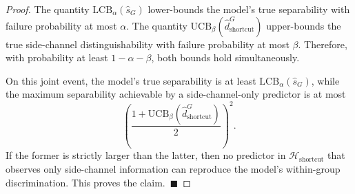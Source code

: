 \documentclass[conference]{IEEEtran}
\theoremstyle{remark}
\newcommand{\LCB}{\mathrm{LCB}}
\newcommand{\UCB}{\mathrm{UCB}}
\newcommand{\shat}{\hat{s}_G}
\newcommand{\hatshortcutDisc}{\hat d_{\mathrm{shortcut}}^{G}}
\newcommand{\shortcutHypCls}{\mathcal{H}_{\mathrm{shortcut}}}
\begin{document}
\begin{proof}
The quantity $\LCB_{\alpha}(\shat)$ lower-bounds the model's true separability
with failure probability at most $\alpha$.
The quantity $\UCB_{\beta}(\hatshortcutDisc)$ upper-bounds the true side-channel
distinguishability with failure probability at most $\beta$.
Therefore, with probability at least $1-\alpha-\beta$, both bounds hold
simultaneously.

On this joint event, the model's true separability is at least
$\LCB_{\alpha}(\shat)$, while the maximum separability achievable by a
side-channel-only predictor is at most
\begin{equation}\label{eq:formula-43}
\left(\frac{1+\UCB_{\beta}(\hatshortcutDisc)}{2}\right)^2 .
\end{equation}
If the former is strictly larger than the latter, then no predictor in $\shortcutHypCls$
that observes only side-channel information can reproduce the model's
within-group discrimination.
This proves the claim.~$\blacksquare$
\end{proof}
\end{document}
